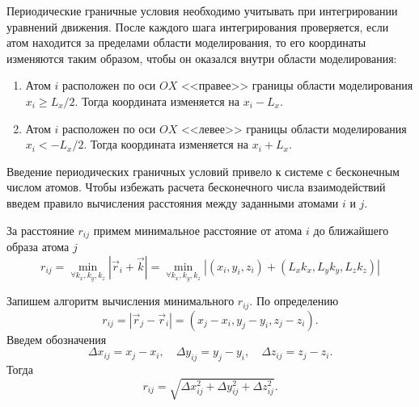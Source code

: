 \documentclass[a4paper, 12pt]{article}
\begin{document}
Периодические граничные условия необходимо учитывать при интегрировании уравнений движения. После каждого шага интегрирования проверяется, если атом находится за пределами области моделирования, то его координаты изменяются таким образом, чтобы он оказался внутри области моделирования:

\begin{enumerate}
\item Атом $i$ расположен по оси $OX$ <<правее>> границы области моделирования $x_i \geq L_x / 2$. Тогда координата изменяется на $x_i - L_x$.

\item Атом $i$ расположен по оси $OX$ <<левее>> границы области моделирования $x_i < -L_x / 2$. Тогда координата изменяется на $x_i + L_x$.
\end{enumerate}

Введение периодических граничных условий привело к системе с бесконечным числом атомов. Чтобы избежать расчета бесконечного числа взаимодействий введем правило вычисления расстояния между заданными атомами $i$ и $j$.

За расстояние $r_{ij}$ примем минимальное расстояние от атома $i$ до ближайшего образа атома $j$
\begin{equation}
r_{ij} = \min_{\forall k_x, k_y, k_z }{| \vec{r}_i + \vec{k} |} =  \min_{\forall k_x, k_y, k_z }{| (x_i, y_i, z_i) + (L_x k_x, L_y k_y, L_z k_z)|}
\end{equation}

Запишем алгоритм вычисления минимального $r_{ij}$. По определению 
\begin{equation}
r_{ij} = |\vec{r}_j - \vec{r}_i| = (x_j - x_i, y_j - y_i, z_j - z_i).
\end{equation}
Введем обозначения 
\begin{equation}
\Delta x_{ij} = x_j - x_i, \quad \Delta y_{ij} = y_j - y_i, \quad \Delta z_{ij} = z_j - z_i.
\end{equation}
 Тогда 
\begin{equation}
r_{ij} = \sqrt{\Delta x_{ij}^2 + \Delta y_{ij}^2 + \Delta z_{ij}^2}.
\end{equation}
\end{document}
